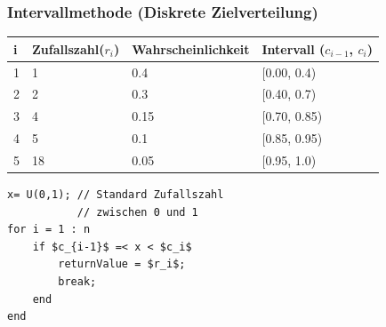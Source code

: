 \subsubsection{Intervallmethode (Diskrete Zielverteilung)}
\begin{minipage}[h]{0.6\textwidth}
	\begin{tabular}{|l|l|l|l|}
		\hline
		\textbf{i} & \textbf{Zufallszahl}($r_i$) & \textbf{Wahrscheinlichkeit} & \textbf{Intervall} ($c_{i-1}$, $c_i$) \\ \hline
		1 & 1 & 0.4 & [0.00, 0.4) \\ \hline
		2 & 2 & 0.3 & [0.40, 0.7) \\ \hline
		3 & 4 & 0.15 & [0.70, 0.85) \\ \hline
		4 & 5 & 0.1 & [0.85, 0.95) \\ \hline
		5 & 18 & 0.05 & [0.95, 1.0) \\ \hline
	\end{tabular}
\end{minipage}
\begin{minipage}[h]{0.3\textwidth}
	\begin{lstlisting}[mathescape=true, tabsize=2]
x= U(0,1); // Standard Zufallszahl 
           // zwischen 0 und 1
for i = 1 : n
	if $c_{i-1}$ =< x < $c_i$
		returnValue = $r_i$;
		break;
	end
end
	\end{lstlisting}
\end{minipage}


